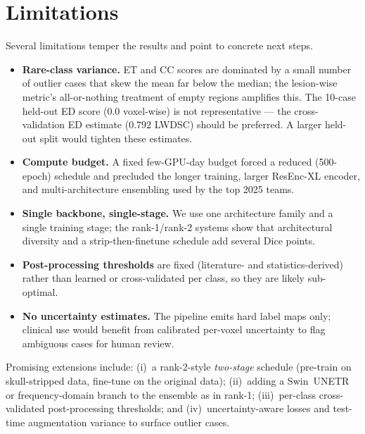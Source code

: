 \documentclass[11pt,a4paper]{article}
\begin{document}
\section{Limitations}
\label{sec:limits}
Several limitations temper the results and point to concrete next steps.
\begin{itemize}[leftmargin=1.4em,itemsep=2pt]
  \item \textbf{Rare-class variance.} ET and CC scores are dominated by a small
        number of outlier cases that skew the mean far below the median; the
        lesion-wise metric's all-or-nothing treatment of empty regions amplifies
        this. The 10-case held-out ED score ($0.0$ voxel-wise) is not
        representative --- the cross-validation ED estimate ($0.792$ LWDSC) should be
        preferred. A larger held-out split would tighten these estimates.
  \item \textbf{Compute budget.} A fixed few-GPU-day budget forced a reduced
        (500-epoch) schedule and precluded the longer training, larger ResEnc-XL
        encoder, and multi-architecture ensembling used by the top 2025 teams.
  \item \textbf{Single backbone, single-stage.} We use one architecture family and a
        single training stage; the rank-1/rank-2 systems show that architectural
        diversity and a strip-then-finetune schedule add several Dice points.
  \item \textbf{Post-processing thresholds} are fixed (literature- and
        statistics-derived) rather than learned or cross-validated per class, so they
        are likely sub-optimal.
  \item \textbf{No uncertainty estimates.} The pipeline emits hard label maps only;
        clinical use would benefit from calibrated per-voxel uncertainty to flag
        ambiguous cases for human review.
\end{itemize}
Promising extensions include: (i)~a rank-2-style \emph{two-stage} schedule
(pre-train on skull-stripped data, fine-tune on the original data); (ii)~adding a
Swin~UNETR or frequency-domain branch to the ensemble as in rank-1; (iii)~per-class
cross-validated post-processing thresholds; and (iv)~uncertainty-aware losses and
test-time augmentation variance to surface outlier cases.

\end{document}
